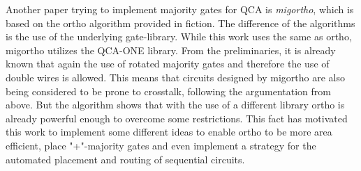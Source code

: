 Another paper trying to implement majority gates for QCA is \textit{migortho}, which is based on the ortho algorithm provided in fiction. The difference of the algorithms is the use of the underlying gate-library. While this work uses the same as ortho, migortho utilizes the QCA-ONE library. From the preliminaries, it is already known that again the use of rotated majority gates and therefore the use of double wires is allowed. This means that circuits designed by migortho are also being considered to be prone to crosstalk, following the argumentation from above. But the algorithm shows that with the use of a different library ortho is already powerful enough to overcome some restrictions. This fact has motivated this work to implement some different ideas to enable ortho to be more area efficient, place "+"-majority gates and even implement a strategy for the automated placement and routing of sequential circuits.

